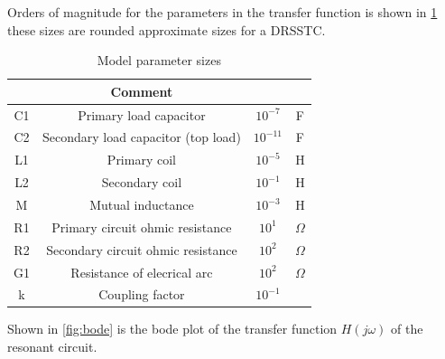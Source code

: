 Orders of magnitude for the parameters in the transfer function is shown in \cref{tab:mod_params} these sizes are rounded approximate sizes for a DRSSTC.

\begin{table}[]
    \centering
    \begin{tabular}{c|c|c|c}
         & Comment &  &\\ \hline
        C1 & Primary load capacitor                 & $10^{-7}$ & F \\
        C2 & Secondary load capacitor (top load)    & $10^{-11}$& F \\
        L1 & Primary coil                           & $10^{-5}$ & H \\
        L2 & Secondary coil                         & $10^{-1}$ & H \\
        M  & Mutual inductance                      & $10^{-3}$ & H \\
        R1 & Primary circuit ohmic resistance       & $10^{1}$  & $\Omega$ \\
        R2 & Secondary circuit ohmic resistance     & $10^{2}$  & $\Omega$ \\
        G1 & Resistance of elecrical arc            & $10^{2}$  & $\Omega$ \\ %
        k  & Coupling factor                        & $10^{-1}$ & 
    \end{tabular}
    \caption{Model parameter sizes}
    \label{tab:mod_params}
\end{table}


Shown in \cref{fig:bode} is the bode plot of the transfer function $H(j\omega)$ of the resonant circuit.

